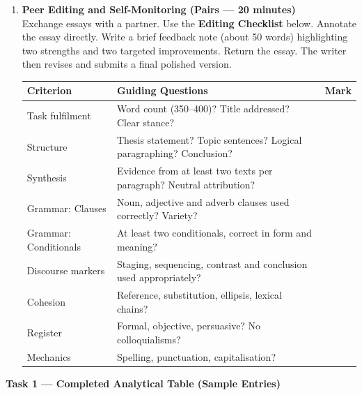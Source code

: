 \documentclass[11pt]{article}
\newcounter{popsec}
\newcounter{popsub}
\newcommand{\courssub}[1]{%
  \stepcounter{popsub}%
  \par\vspace{9pt}\noindent{\popxbold\fontsize{11.5}{13}\selectfont\color{popink}{\color{poporange}\thepopsec.\thepopsub}\hspace{6pt}#1}\par\nopagebreak\vspace{4pt}
}
\begin{document}
\begin{enumerate}
    \item \textbf{Peer Editing and Self-Monitoring (Pairs --- 20 minutes)} \\
    Exchange essays with a partner. Use the \textbf{Editing Checklist} below. Annotate the essay directly. Write a brief feedback note (about 50 words) highlighting two strengths and two targeted improvements. Return the essay. The writer then revises and submits a final polished version.
    \begin{center}
    \begin{tabularx}{\linewidth}{|l|X|c|}\hline
    \rowcolor{popblueL}
    \textbf{Criterion} & \textbf{Guiding Questions} & \textbf{Mark} \\ \hline
    Task fulfilment & Word count (350--400)? Title addressed? Clear stance? & \\ \hline
    Structure & Thesis statement? Topic sentences? Logical paragraphing? Conclusion? & \\ \hline
    Synthesis & Evidence from at least two texts per paragraph? Neutral attribution? & \\ \hline
    Grammar: Clauses & Noun, adjective and adverb clauses used correctly? Variety? & \\ \hline
    Grammar: Conditionals & At least two conditionals, correct in form and meaning? & \\ \hline
    Discourse markers & Staging, sequencing, contrast and conclusion used appropriately? & \\ \hline
    Cohesion & Reference, substitution, ellipsis, lexical chains? & \\ \hline
    Register & Formal, objective, persuasive? No colloquialisms? & \\ \hline
    Mechanics & Spelling, punctuation, capitalisation? & \\ \hline
    \end{tabularx}
    \end{center}
\end{enumerate}

\courssub{Model answer}

\textbf{Task 1 --- Completed Analytical Table (Sample Entries)}
\end{document}
